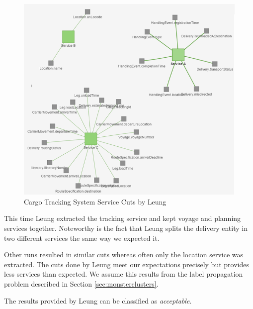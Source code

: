 \begin{figure}[H]
	\includegraphics[scale=0.9]{images/leung_tracking.png}
	\caption{Cargo Tracking System Service Cuts by Leung}
	\label{fig:dddleungTracking}
\end{figure}

This time Leung extracted the tracking service and kept voyage and planning services together. Noteworthy is the fact that Leung splits the delivery entity in two different services the same way we expected it. 

Other runs resulted in similar cuts whereas often only the location service was extracted. The cuts done by Leung meet our expectations precisely but provides less services than expected. We assume this results from the label propagation problem described in Section \ref{sec:monsterclusters}. 

The results provided by Leung can be classified as \textit{acceptable}.









